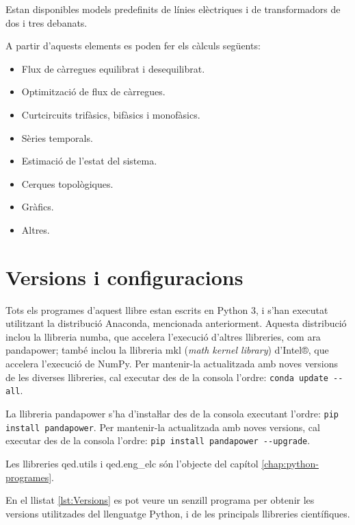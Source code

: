 Estan disponibles models predefinits de línies elèctriques i de transformadors de dos i tres debanats.

A partir d'aquests elements  es poden fer els càlculs següents:
\begin{itemize}
	\item Flux de càrregues equilibrat i desequilibrat.
	\item Optimització de flux de càrregues.
	\item Curtcircuits trifàsics, bifàsics i monofàsics.
	\item Sèries temporals.
	\item Estimació de l'estat del sistema.
	\item Cerques topològiques.
	\item Gràfics.
	\item Altres.
\end{itemize}


\section{Versions i configuracions}\label{sec:python-versions}

Tots els programes d'aquest llibre estan escrits en Python 3, i s'han executat utilitzant la distribució Anaconda, mencionada anteriorment. Aquesta distribució inclou la llibreria numba, que accelera l'execució d'altres llibreries, com ara pandapower; també inclou la llibreria mkl (\textit{math kernel library})  d'Intel®, que accelera l'execució de NumPy. Per mantenir-la actualitzada amb noves versions de les diverses llibreries, cal executar des de la consola    l'ordre: \texttt{conda update  -{}-all}.


La llibreria pandapower s'ha d'instaŀlar des de la consola executant   l'ordre: \texttt{pip install pandapower}. Per mantenir-la actualitzada amb noves versions, cal executar des de la consola    l'ordre: \texttt{pip install pandapower -{}-upgrade}.

 Les llibreries qed.utils i qed.eng\_elc són l'objecte del capítol \ref{chap:python-programes}. 

En el llistat \vref{lst:Versions} es pot veure un senzill programa per obtenir les versions utilitzades  del llenguatge Python, i de les  principals llibreries científiques.


